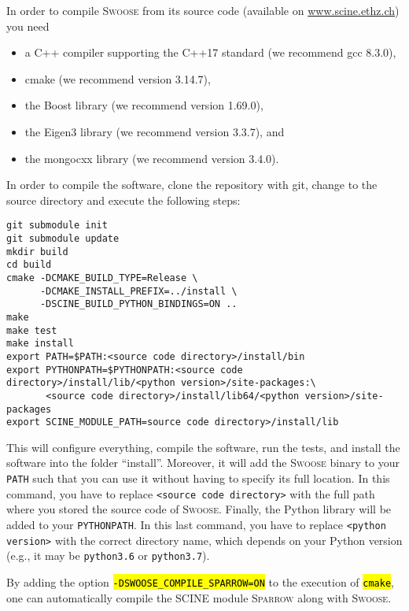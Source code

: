 \documentclass[]{tufte-book}
\begin{document}
In order to compile \textsc{Swoose} from its source code (available on \href{https://scine.ethz.ch/}{www.scine.ethz.ch}) you need
\begin{itemize}
 \item a C++ compiler supporting the C++17 standard (we recommend gcc 8.3.0),
 \item cmake (we recommend version 3.14.7),
 \item the Boost library (we recommend version 1.69.0),
 \item the Eigen3 library (we recommend version 3.3.7), and
 \item the mongocxx library (we recommend version 3.4.0).
\end{itemize}
In order to compile the software, clone the repository with git, change
to the source directory and execute the following steps:
\begin{mdframed}[backgroundcolor=LightSteelBlue!25, userdefinedwidth=18cm, linewidth=0pt]
\begin{verbatim}
git submodule init
git submodule update
mkdir build
cd build
cmake -DCMAKE_BUILD_TYPE=Release \
      -DCMAKE_INSTALL_PREFIX=../install \
      -DSCINE_BUILD_PYTHON_BINDINGS=ON ..
make
make test
make install
export PATH=$PATH:<source code directory>/install/bin
export PYTHONPATH=$PYTHONPATH:<source code directory>/install/lib/<python version>/site-packages:\
       <source code directory>/install/lib64/<python version>/site-packages
export SCINE_MODULE_PATH=source code directory>/install/lib
\end{verbatim}
\end{mdframed}
This will configure everything, compile the software, run the tests, and install the software
into the folder ``install''. Moreover, it will add the \textsc{Swoose} binary to your \texttt{PATH} such that you can use
it without having to specify its full location. In this command, you have to replace \texttt{<source code directory>}
with the full path where you stored the source code of \textsc{Swoose}. Finally, the Python library will be added to your \texttt{PYTHONPATH}. In this last command, you have to replace \texttt{<python version>} with the correct directory name, which depends on your Python version (e.g., it may be \texttt{python3.6} or \texttt{python3.7}).

By adding the option \hl{\:\texttt{-DSWOOSE\_COMPILE\_SPARROW=ON}\:} to the execution of \hl{\:\texttt{cmake}\:}, one can automatically compile the SCINE module \textsc{Sparrow}\cite{sparrow_zenodo} along with \textsc{Swoose}.
\end{document}
